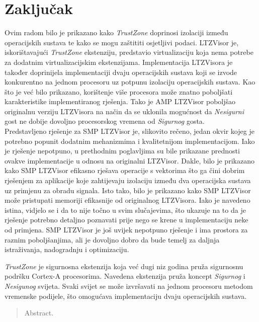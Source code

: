\documentclass[times, utf8, diplomski, numeric]{fer}
\begin{document}
\chapter{Zaključak}
Ovim radom bilo je prikazano kako \textit{TrustZone} doprinosi izolaciji između operacijskih sustava te kako se
mogu zaštititi osjetljivi podaci. LTZVisor je, iskorištavajući \textit{TrustZone} ekstenziju, predstavio virtualizaciju
koja nema potrebe za dodatnim virtualizacijskim ekstenzijama. Implementacija LTZVisora je također doprinijela
implementaciji dvaju operacijskih sustava koji se izvode konkurentno na jednom procesoru uz potpunu izolaciju
operacijskih sustava. Kao što je već bilo prikazano, korištenje više procesora može znatno poboljšati karakteristike
implementiranog rješenja. Tako je AMP LTZVisor poboljšao originalnu verziju LTZVisora na način da se uklonila mogućnost
da \textit{Nesigurni} gost ne dobije dovoljno procesorskog vremena od \textit{Sigurnog} gosta.\\
Predstavljeno rješenje za SMP LTZVisor je, slikovito rečeno, jedan okvir kojeg je potrebno popunit dodatnim mehanizmima
i kvalitetnijom implementacijom. Iako je rješenje nepotpuno, u prethodnim poglavljima su bile prikazane prednosti
ovakve implementacije u odnosu na originalni LTZVisor. Dakle, bilo je prikazano kako SMP LTZVisor efikasno rješava
operacije s vektorima što ga čini dobrim rješenjem za aplikacije koje zahtijevaju izolaciju između dva operacijska
sustava uz primjenu za obradu signala. Isto tako, bilo je prikazano kako SMP LTZVisor može pristupati memoriji efikasnije
od originalnog LTZVisora. Iako je navedeno istina, vidjelo se i da to nije točno u svim slučajevima, što ukazuje na to
da je rješenje potrebno detaljno poznavati prije nego se krene u implementaciju neke od primjena. SMP LTZVisor
je još uvijek nepotpuno rješenje i ima prostora za raznim poboljšanjima, ali je dovoljno dobro da bude temelj za
daljnja istraživanja, nadogradnju i optimizaciju.





\begin{sazetak}
\textit{TrustZone} je sigurnosna ekstenzija koja već dugi niz godina pruža sigurnosnu podršku Cortex-A procesorima.
Navedena ekstenzija pruža koncept \textit{Sigurnog}  i \textit{Nesigunog}  svijeta.
Svaki svijet se može izvršavati na jednom procesoru metodom vremenske podijele, što omogućava implementaciju
dvaju operacijskih sustava.

\end{sazetak}

\begin{abstract}
Abstract.

\end{abstract}
\end{document}
